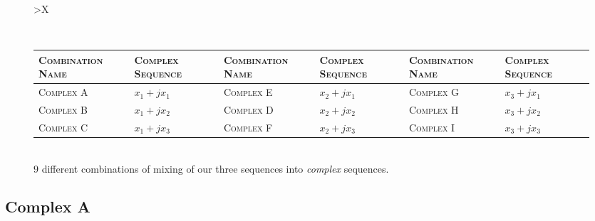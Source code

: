 \documentclass[../../course]{subfiles}
\begin{document}
\begin{figure} [H]
    \centering

    \begin{tabularx} {\textwidth} {
            *{1}{>{\centering\arraybackslash}X}
        }

        \\

        { \begin{tabularx} {\textwidth} {
                *{6}{>{\centering\arraybackslash}X}
            }

            \toprule
            \textsc{Combination Name} & \textsc{Complex Sequence} &
            \textsc{Combination Name} & \textsc{Complex Sequence} &
            \textsc{Combination Name} & \textsc{Complex Sequence} \\
            \midrule

            \textsc{Complex A} & $x_{1} + j x_{1}$ &
            \textsc{Complex E} & $x_{2} + j x_{1}$ &
            \textsc{Complex G} & $x_{3} + j x_{1}$ \\

            \textsc{Complex B} & $x_{1} + j x_{2}$ &
            \textsc{Complex D} & $x_{2} + j x_{2}$ &
            \textsc{Complex H} & $x_{3} + j x_{2}$ \\

            \textsc{Complex C} & $x_{1} + j x_{3}$ &
            \textsc{Complex F} & $x_{2} + j x_{3}$ &
            \textsc{Complex I} & $x_{3} + j x_{3}$ \\

            \bottomrule

        \end{tabularx} } \\

         {
            $9$ different combinations of mixing of our three sequences into \emph{complex}
            sequences.
        }
        \label{tbl:cplxSeqs}
        \\

    \end{tabularx}


\end{figure}

\pagebreak

\subsection{Complex A} \label{ssec:visCplxA}
\end{document}
